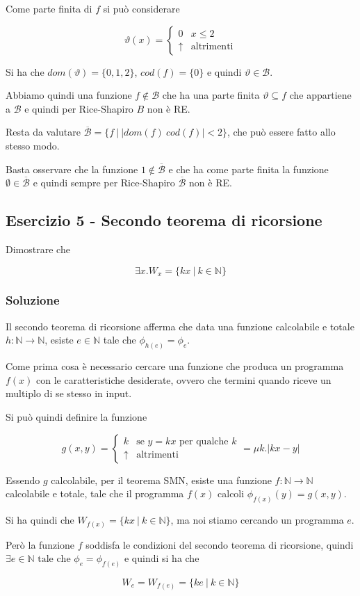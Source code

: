 Come parte finita di $f$ si può considerare

$$
\vartheta(x) = \begin{cases}
0 & x \leq 2 \\
\uparrow &\text{altrimenti}
\end{cases}
$$

Si ha che $dom(\vartheta) = \{0,1,2\}$, $cod(f) = \{0\}$ e quindi $\vartheta \in \mathcal{B}$.

Abbiamo quindi una funzione $f \notin \mathcal{B}$ che ha una parte finita $\vartheta \subseteq f$ che appartiene a $\mathcal{B}$ e quindi per Rice-Shapiro $B$ non è RE.

Resta da valutare $\overline{\mathcal{B}} = \{ f \: | \: |dom(f) \ cod(f)| < 2 \}$, che può essere fatto allo stesso modo.

Basta osservare che la funzione $1 \notin \overline{\mathcal{B}}$  e che ha come parte finita la funzione $\emptyset \in \overline{\mathcal{B}}$ e quindi sempre per Rice-Shapiro $\overline{\mathcal{B}}$ non è RE.


\subsection{Esercizio 5 - Secondo teorema di ricorsione}

Dimostrare che 

$$
 \exists x . W_x = \{ kx \: | \: k \in \mathbb{N} \}
$$

\subsubsection{Soluzione}

Il secondo teorema di ricorsione afferma che data una funzione calcolabile e totale $h : \mathbb{N} \rightarrow \mathbb{N}$, esiste $e \in \mathbb{N}$ tale che $\phi_{h(e)} = \phi_e$.

Come prima cosa è necessario cercare una funzione che produca un programma $f(x)$ con le caratteristiche desiderate, ovvero che termini quando riceve un multiplo di se stesso in input.

Si può quindi definire la funzione

$$
g(x,y) = \begin{cases}
k &\text{se } y = kx \text{ per qualche }k \\
 \uparrow &\text{altrimenti}
\end{cases} = \mu k . |kx - y|
$$

Essendo $g$ calcolabile, per il teorema SMN, esiste una funzione $f : \mathbb{N} \rightarrow \mathbb{N}$ calcolabile e totale, tale che il programma $f(x)$ calcoli $\phi_{f(x)}(y) = g(x,y)$.

Si ha quindi che $W_{f(x)} =  \{ kx \: | \: k \in \mathbb{N} \}$, ma noi stiamo cercando un programma $e$.
	
Però la funzione $f$ soddisfa le condizioni del secondo teorema di ricorsione, quindi $\exists e \in \mathbb{N} \text{ tale che } \phi_e = \phi_{f(e)}$ e quindi si ha che

$$
W_e = W_{f(e)} =  \{ ke \: | \: k \in \mathbb{N} \}
$$